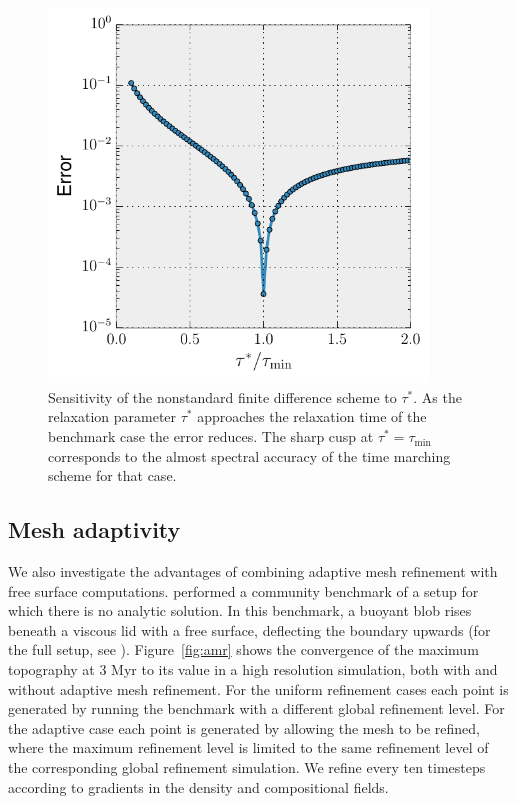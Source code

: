 \documentclass[preprint,12pt,authoryear]{elsarticle}
\begin{document}
\begin{figure}
\includegraphics[width=0.9\textwidth]{figures/tau_sensitivity.pdf}
\caption{Sensitivity of the nonstandard finite difference scheme to $\tau^*$. As the relaxation parameter $\tau^*$ approaches the relaxation time of the benchmark case the error reduces. The sharp cusp at $\tau^* = \tau_\mathrm{min}$ corresponds to the almost spectral accuracy of the time marching scheme for that case.}
\label{fig:tau_sensitivity}
\end{figure}

\subsection{Mesh adaptivity}
\label{sec:mesh_adaptivity}

We also investigate the advantages of combining adaptive mesh refinement with free surface computations.
\citet{crameri2012comparison} performed a community benchmark of a setup for which there is no analytic
solution. In this benchmark, a buoyant blob rises beneath a viscous lid with a free surface, deflecting the
boundary upwards (for the full setup, see \citet{crameri2012comparison}). 
Figure~\ref{fig:amr} shows the convergence of the maximum topography at 3 Myr to its value in a high resolution simulation,
both with and without adaptive mesh refinement.
For the uniform refinement cases each point is generated by running the benchmark with a different global refinement level.
For the adaptive case each point is generated by allowing the mesh to be refined, where the maximum refinement level
is limited to the same refinement level of the corresponding global refinement simulation.
We refine every ten timesteps according to gradients in the density and compositional fields.
\end{document}
